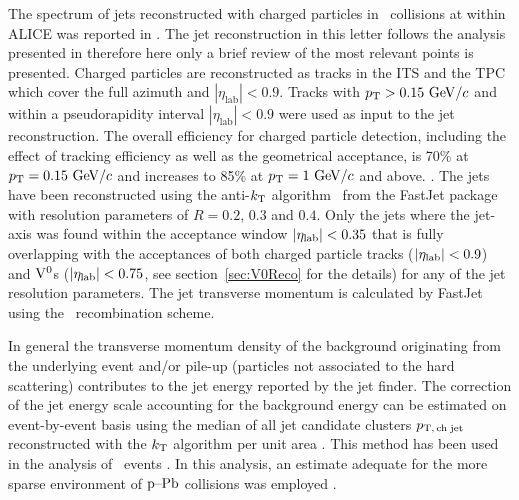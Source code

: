 The spectrum of jets reconstructed with charged particles in \pPb\ collisions at  within ALICE was reported in \cite{Adam:2015hoa}.
The jet reconstruction in this letter follows the analysis presented in \cite{Adam:2015hoa} therefore here only a brief review of the most relevant points is presented.
Charged particles are reconstructed as tracks in the ITS and the TPC which cover the full azimuth and $|\eta_\mathrm{lab}| < 0.9$. 
Tracks with $p_{\mathrm{T}} > 0.15 \mathrm{~GeV}/c$ and within a pseudorapidity interval $|\eta_\mathrm{lab}|<0.9$ were used as input to the jet reconstruction.
The overall efficiency for charged particle detection, including the effect of tracking efficiency as well as the geometrical acceptance, is 70\% at $p_{\mathrm{T}} = 0.15 \mbox{~GeV}/c$ and increases to 85\% at $p_{\mathrm{T}} = 1 \mbox{~GeV}/c$ and above. 
.
The jets have been reconstructed using the anti-$k_{\rm T}$ algorithm~\cite{Cacciari:2008gp} from the FastJet package~\cite{Cacciari:2011ma,Cacciari:2005hq} with resolution parameters of $R=0.2$, $0.3$ and $0.4$. 
Only the jets where the jet-axis was found within the acceptance window $\left|\eta_{\rm lab}\right|<0.35$ that is fully overlapping with the acceptances of both charged particle tracks ($\left|\eta_{\rm lab}\right|<0.9$) and ${\rm V}^{0}$s ($\left|\eta_{\rm lab}\right|<0.75$, see section~\ref{sec:V0Reco} for the details) for any of the jet resolution parameters.
The jet transverse momentum is calculated by FastJet using the \pt\ recombination scheme. 


In general the transverse momentum density of the background originating from the underlying event and/or pile-up (particles not associated to the hard scattering) contributes to the jet energy reported by the jet finder. 
The correction of the jet energy scale accounting for the background energy can be estimated on event-by-event basis using the median of all jet candidate clusters $p_\mathrm{T,\,ch\;jet}$ reconstructed with the $k_{\textnormal{T}}$ algorithm per unit area \cite{Cacciari:2008gn}. 
This method has been used in the analysis of \PbPb\ events \cite{Abelev:2013kqa,Adam:2015ewa}.
In this analysis, an estimate adequate for the more sparse environment of $\mbox{p--Pb}$ collisions was employed \cite{Adam:2015hoa}.


